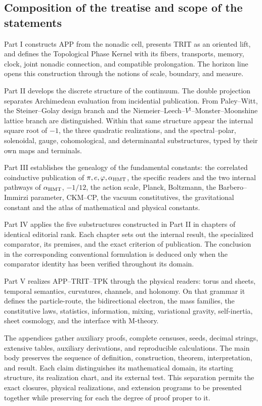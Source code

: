 \subsection*{Composition of the treatise and scope of the statements}

Part I constructs APP from the nonadic cell, presents TRIT as an
oriented lift, and defines the Topological Phase Kernel with its fibers,
transports, memory, clock, joint nonadic connection, and compatible
prolongation. The horizon line opens this construction through the
notions of scale, boundary, and measure.

Part II develops the discrete structure of the continuum. The double
projection separates Archimedean evaluation from incidential publication.
From Paley--Witt, the Steiner--Golay design branch and the
Niemeier--Leech--\(V^\natural\)--Monster--Moonshine lattice branch are distinguished. Within that same structure
appear the internal square root of \(-1\), the three quadratic realizations, and the
spectral--polar, solenoidal, gauge, cohomological, and
determinantal substructures, typed by their own maps and terminals.

Part III establishes the genealogy of the fundamental constants: the
correlated coinductive publication of
\(\pi,e,\varphi,\alpha_{\rm HMT}\), the specific readers and the two internal
pathways of \(\alpha_{\rm HMT}\), \(-1/12\), the action scale, Planck,
Boltzmann, the Barbero--Immirzi parameter, CKM--CP, the vacuum
constitutives, the gravitational constant and the atlas of mathematical and
physical constants.

Part IV applies the five substructures constructed in Part II in
chapters of identical editorial rank. Each chapter sets out the internal
result, the specialized comparator, its premises, and the exact criterion of
publication. The conclusion in the corresponding conventional formulation is
deduced only when the comparator identity has been verified throughout its
domain.

Part V realizes APP--TRIT--TPK through the physical readers: torus and sheets,
temporal semantics, curvatures, channels, and holonomy. On that grammar it
defines the particle-route, the bidirectional electron, the mass families,
the constitutive laws, statistics, information, mixing, variational gravity,
self-inertia, sheet cosmology, and the interface with M-theory.

The appendices gather auxiliary proofs, complete censuses, seeds, decimal strings, extensive tables, auxiliary derivations, and reproducible calculations. The main body preserves the sequence of definition, construction, theorem, interpretation, and result. Each claim distinguishes its mathematical domain, its starting structure, its realization chart, and its external test. This separation permits the exact closures, physical realizations, and extension programs to be presented together while preserving for each the degree of proof proper to it.
